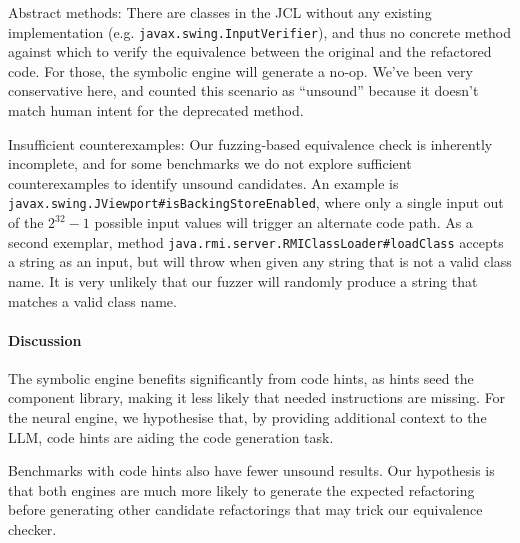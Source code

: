 \documentclass[sigconf,review,anonymous]{acmart}
\begin{document}
Abstract methods: 
There are classes in the JCL without any
existing implementation (e.g. \lstinline{javax.swing.InputVerifier}), and thus no concrete
method against which to verify the equivalence between the original and the refactored code. For those, the symbolic engine will
generate a no-op. We've been very conservative here, and counted this scenario as ``unsound'' because
it doesn't match human intent for the deprecated method.

Insufficient counterexamples: Our fuzzing-based equivalence check is inherently
incomplete, and for some benchmarks we do not explore sufficient counterexamples
to identify unsound candidates. An example 
is \lstinline[breaklines=true]{javax.swing.JViewport#isBackingStoreEnabled}, where only a single input
out of the $2^{32}-1$ possible input values will trigger an alternate code path.
As a second exemplar, method \lstinline[breaklines=true]{java.rmi.server.RMIClassLoader#loadClass}
accepts a string as an input, but will throw when given any string
that is not a valid class name. %
It is very unlikely that our fuzzer will randomly produce a string that matches a valid class
name.

\paragraph{Discussion}

The symbolic engine benefits significantly from code hints, as hints seed
the component library, making it less likely that needed instructions are
missing.  For the neural engine, we hypothesise that, by providing
additional context to the LLM, code hints are aiding the code generation
task.

Benchmarks with code hints also have fewer unsound results.  Our hypothesis
is that both engines are much more likely to generate the expected
refactoring before generating other candidate refactorings that may trick
our equivalence checker.
\end{document}
